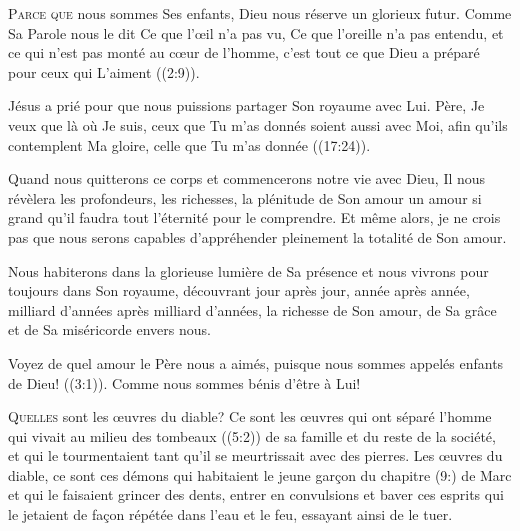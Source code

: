 \lettrine{P}{arce que} nous sommes Ses enfants,
 Dieu nous réserve un glorieux futur.
 Comme Sa Parole nous le dit\frcolon{} 
 \Og Ce que l'\oe{}il n'a pas vu, Ce que l'oreille n'a pas entendu,
 et ce qui n'est pas monté au c\oe{}ur de l'homme,
 c'est tout ce que Dieu a préparé pour ceux qui L'aiment \Fg{}
 ((2:9)). 

Jésus a prié pour que nous puissions partager Son royaume avec Lui.
 \Og Père, Je veux que là où Je suis, ceux que Tu m'as donnés
 soient aussi avec Moi, afin qu'ils contemplent Ma gloire,
 celle que Tu m'as donnée \Fg{} ((17:24)). 


Quand nous quitterons ce corps et commencerons notre vie avec Dieu,
 Il nous révèlera les profondeurs, les richesses, la plénitude de Son amour
 \ocadr un amour si grand qu'il faudra tout l'éternité pour le comprendre.
 Et même alors, je ne crois pas que nous serons capables d'appréhender
 pleinement la totalité de Son amour. 

Nous habiterons dans la glorieuse lumière de Sa présence et nous vivrons
 pour toujours dans Son royaume, découvrant jour après jour,
 année après année, milliard d'années après milliard d'années,
 la richesse de Son amour, de Sa grâce et de Sa miséricorde envers nous. 

\Og Voyez de quel amour le Père nous a aimés, puisque nous sommes appelés
 enfants de Dieu! \Fg{} ((3:1)).
 Comme nous sommes bénis d'être à Lui! 

\dvrule






\lettrine{Q}{uelles} sont les \oe{}uvres du diable?
 Ce sont les \oe{}uvres qui ont séparé l'homme qui vivait
 au milieu des tombeaux ((5:2)) de sa famille
 et du reste de la société, et qui le tourmentaient tant
 qu'il se meurtrissait avec des pierres.
 Les \oe{}uvres du diable, ce sont ces démons qui habitaient le jeune gar\c{c}on
 du chapitre (9:) de Marc et qui le faisaient grincer des dents,
 entrer en convulsions et baver \ocadr ces esprits qui le jetaient
 de fa\c{c}on répétée dans l'eau et le feu, essayant ainsi de le tuer. 

